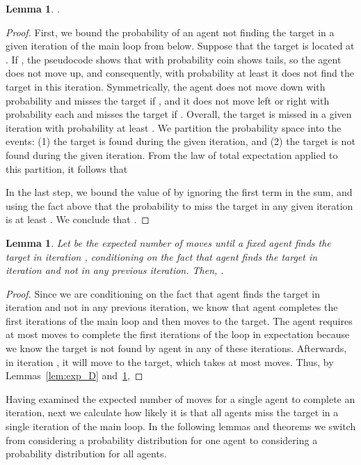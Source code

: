 \documentclass[11pt]{article}
\newtheorem{lemma}[theorem]{Lemma}
\begin{document}
\begin{lemma}
\label{lem:condition}
	 .
\end{lemma}
\begin{proof}

First, we bound the probability of an agent not finding the target in a given iteration of the main loop from below. Suppose that the target is located at . If , the pseudocode shows that with probability  coin  shows tails, so the agent does not move up, and consequently, with probability at least  it does not find the target in this iteration. Symmetrically, the agent does not move down with probability  and misses the target if , and it does not move left or right with probability  each and misses the target if . Overall, the target is missed in a given iteration with probability at least . We partition the probability space into the events: (1) the target is found during the given iteration, and (2) the target is not found during the given iteration. From the law of total expectation applied to this partition, it follows that 


In the last step, we bound the value of  by ignoring the first term in the sum, and using the fact above that the probability to miss the target in any given iteration is at least . We conclude that .
\end{proof}


\begin{lemma}
\label{lem:ria}
Let  be the expected number of moves until a fixed agent  finds the target in iteration , conditioning on the fact that agent  finds the target in iteration  and not in any previous iteration. Then, .
\end{lemma}
\begin{proof}
 Since we are conditioning on the fact that agent  finds the target in iteration  and not in any previous iteration, we know that agent  completes the first  iterations of the main loop and then moves to the target. The agent requires at most  moves to complete the first  iterations of the loop in expectation because we know the target is not found by  agent  in any of these iterations. Afterwards, in iteration , it will move to the target, which takes at most  moves. Thus, by Lemmas~\ref{lem:exp_D} and~\ref{lem:condition}, 


\end{proof}

Having examined the expected number of moves for a single agent to complete an iteration, next we calculate how likely it is that all agents miss the target in a single iteration of the main loop. In the following lemmas and theorems we  switch from considering a probability distribution for one agent to considering a probability distribution for all  agents.
\end{document}
